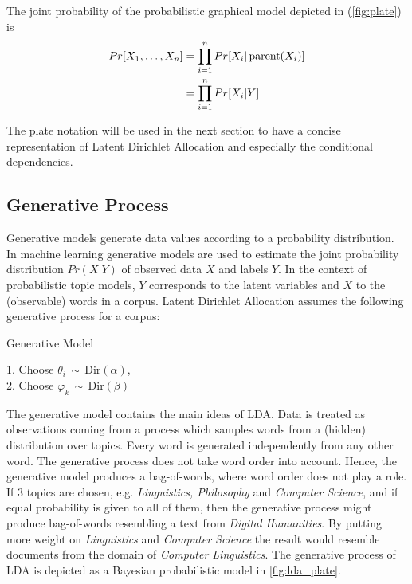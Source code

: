 \documentclass[a4paper,ngerman, english]{atseminar}
\DeclareMathOperator{\parent}{parent}
\begin{document}
The joint probability of the probabilistic graphical model depicted in (\autoref{fig:plate}) is
\begin{align}
Pr[X_1,\ldots,X_n] &=\prod_{i=1}^nPr[X_i | \parent(X_i)] \\
                            &= \prod_{i=1}^nPr[X_i | Y] \notag
\end{align}

The plate notation will be used in the next section to have a concise representation of
Latent Dirichlet Allocation and especially the conditional dependencies.

%


\subsection{Generative Process}
Generative models generate data values according to a probability distribution. In machine learning
generative models are used to estimate the joint probability distribution $Pr(X | Y)$ of observed data $X$
and labels $Y$. In the context of probabilistic topic models, $Y$ corresponds to the latent variables and $X$
to the (observable) words in a corpus.
Latent Dirichlet Allocation assumes the following generative process for
a corpus: \\

\begin{algorithm}[H]
\caption{Generative Model}
1. Choose $ \theta_i \, \sim \, \mathrm{Dir}(\alpha) $,  \\
2. Choose $ \varphi_k \, \sim \, \mathrm{Dir}(\beta) $ \\
\end{algorithm}
\vspace{1.5cm}

The generative model contains the main ideas of LDA. Data is treated as observations
coming from a process which samples words from a (hidden) distribution over topics.
Every word is generated independently from any other word. The generative process
does not take word order into account. Hence, the generative model produces a
bag-of-words, where word order does not play a role. \\
If $3$ topics are chosen, e.g. \textit{Linguistics, Philosophy} and \textit{Computer Science}, and if 
equal probability is given to all of them, then the generative process might produce 
bag-of-words resembling a text from \textit{Digital Humanities}. By putting more weight 
on \textit{Linguistics} and \textit{Computer Science} the result would resemble 
documents from the domain of \textit{Computer Linguistics}.
The generative process of LDA is depicted as a Bayesian probabilistic model in \autoref{fig:lda_plate}.
\end{document}
